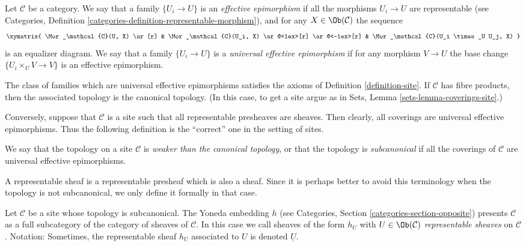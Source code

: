 \begin{definition}
\label{definition-universal-effective-epimorphisms}
Let $\mathcal{C}$ be a category. We say that a family $\{U_i \to U\}$ is an
{\it effective epimorphism}
if all the morphisms $U_i \to U$ are representable (see
Categories, Definition \ref{categories-definition-representable-morphism}),
and for any $X\in \Ob(\mathcal{C})$ the sequence
$$
\xymatrix{
\Mor_\mathcal{C}(U, X) \ar[r]
&
\Mor_\mathcal{C}(U_i, X)
\ar@<1ex>[r] \ar@<-1ex>[r]
&
\Mor_\mathcal{C}(U_i \times_U U_j, X)
}
$$
is an equalizer diagram. We say that a family $\{U_i \to U\}$ is a
{\it universal effective epimorphism} if for any morphism $V \to U$
the base change $\{U_i \times_U V \to V\}$ is an effective epimorphism.
\end{definition}

\noindent
The class of families which are universal effective epimorphisms
satisfies the axioms of Definition \ref{definition-site}.
If $\mathcal{C}$ has fibre products, then the associated topology is
the canonical topology. (In this case, to get a site argue as in Sets,
Lemma \ref{sets-lemma-coverings-site}.)

\medskip\noindent
Conversely, suppose that $\mathcal{C}$ is a site such that
all representable presheaves are sheaves. Then clearly, all
coverings are universal effective epimorphisms.
Thus the following definition is the ``correct'' one in the
setting of sites.

\begin{definition}
\label{definition-weaker-than-canonical}
We say that the topology on a site $\mathcal{C}$ is
{\it weaker than the canonical topology}, or that the topology is
{\it subcanonical} if all the coverings
of $\mathcal{C}$ are universal effective epimorphisms.
\end{definition}

\noindent
A representable sheaf is a representable presheaf which is also a
sheaf. Since it is perhaps better to avoid this terminology when the
topology is not subcanonical, we only define it formally in that case.

\begin{definition}
\label{definition-representable-sheaf}
Let $\mathcal{C}$ be a site whose topology is subcanonical.
The Yoneda embedding $h$ (see
Categories, Section \ref{categories-section-opposite})
presents $\mathcal{C}$ as a full subcategory of the
category of sheaves of $\mathcal{C}$. In this case
we call sheaves of the form $h_U$ with $U \in \Ob(\mathcal{C})$
{\it representable sheaves} on $\mathcal{C}$.
Notation: Sometimes, the representable sheaf $h_U$ associated to $U$ is
denoted {\it $\underline{U}$}.
\end{definition}

